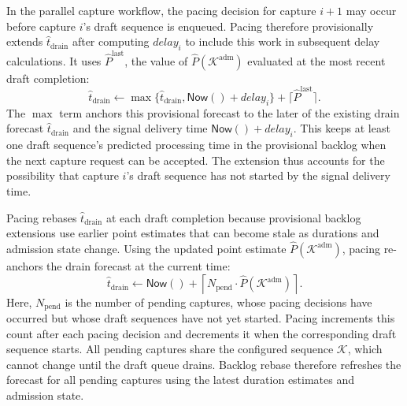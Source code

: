 In the parallel capture workflow, the pacing decision for capture \(i+1\) may occur before capture \(i\)'s draft sequence is enqueued.
Pacing therefore provisionally extends \(\hat t_{\mathrm{drain}}\) after computing \(\mathit{delay}_i\) to include this work in subsequent delay calculations.
It uses \(\hat P^{\mathrm{last}}\), the value of \(\hat P(\mathcal K^{\mathrm{adm}})\) evaluated at the most recent draft completion:
\begin{equation}
  \hat t_{\mathrm{drain}}
  \gets
  \max\{\hat t_{\mathrm{drain}},\textsf{Now}()+\mathit{delay}_i\}
  +\lceil\hat P^{\mathrm{last}}\rceil.
  \label{eq:clock-update}
\end{equation}
The \(\max\) term anchors this provisional forecast to the later of the existing drain forecast \(\hat t_{\mathrm{drain}}\) and the signal delivery time \(\textsf{Now}()+\mathit{delay}_i\).
This keeps at least one draft sequence's predicted processing time in the provisional backlog when the next capture request can be accepted.
The extension thus accounts for the possibility that capture \(i\)'s draft sequence has not started by the signal delivery time.

Pacing rebases \(\hat t_{\mathrm{drain}}\) at each draft completion because provisional backlog extensions use earlier point estimates that can become stale as durations and admission state change.
Using the updated point estimate \(\hat P(\mathcal K^{\mathrm{adm}})\), pacing re-anchors the drain forecast at the current time:
\begin{equation}
  \hat t_{\mathrm{drain}}
  \gets
  \textsf{Now}()
  +\left\lceil
    N_{\mathrm{pend}}\cdot\hat P(\mathcal K^{\mathrm{adm}})
  \right\rceil.
  \label{eq:clock-rebase}
\end{equation}
Here, \(N_{\mathrm{pend}}\) is the number of pending captures, whose pacing decisions have occurred but whose draft sequences have not yet started.
Pacing increments this count after each pacing decision and decrements it when the corresponding draft sequence starts.
All pending captures share the configured sequence \(\mathcal K\), which cannot change until the draft queue drains.
Backlog rebase therefore refreshes the forecast for all pending captures using the latest duration estimates and admission state.
